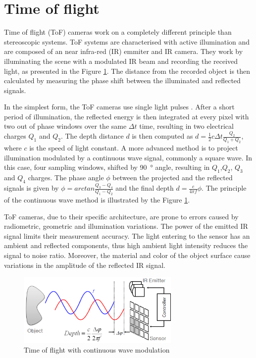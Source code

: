 \section{Time of flight}
\label{sec:tof}

Time of flight (ToF) cameras work on a completely different principle than stereoscopic systems. ToF systems are characterised with active illumination and are composed of an near infra-red (IR) emmiter and IR camera. They work by illuminating the scene with a modulated IR beam and recording the received light, as presented in the Figure \ref{fig:tofprinciple}. The distance from the recorded object is then calculated by measuring the phase shift between the illuminated and reflected signals. 

In the simplest form, the ToF cameras use single light pulses \cite{titof}. After a short period of illumination, the reflected energy is then integrated at every pixel with two out of phase windows over the same $\Delta t$ time, resulting in two electrical charges $Q_1$ and $Q_2$. The depth distance $d$ is then computed as $d = \frac{1}{2}c\Delta t \frac{Q_2}{Q_1+Q_2}$, where $c$ is the speed of light constant. A more advanced method is to project illumination modulated by a continuous wave signal, commonly a square wave. In this case, four sampling windows, shifted by \SI{90}{\degree} angle, resulting in $Q_1$,$Q_2$, $Q_3$ and $Q_4$ charges. The phase angle $\phi$ between the projected and the reflected signals is given by $\phi = arctan \frac{Q_3 - Q_4}{Q_1 - Q_2} $ and the final depth $d = \frac{c}{4\pi f}\phi$. The principle of the continuous wave method is illustrated by the Figure \ref{fig:tofprinciple}.

ToF cameras, due to their specific architecture, are prone to errors caused by radiometric, geometric and illumination variations. The power of the emitted IR signal limits their measurement accuracy. The light entering to the sensor has an ambient and reflected components, thus high ambient light intensity reduces the signal to noise ratio. Moreover, the material and color of the object surface cause variations in the amplitude of the reflected IR signal.

\begin{figure}[H]
\label{fig:tof}
\centering
\includegraphics[width=0.7\textwidth]{fig/tofprinciple}
\caption{Time of flight with continuous wave modulation \cite{ToFbook}}
\label{fig:tofprinciple}
\end{figure}

